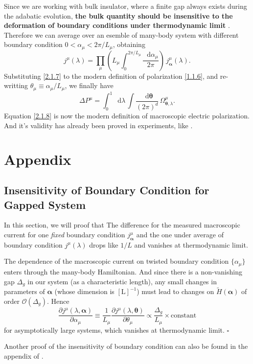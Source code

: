 \documentclass[10pt,nofootinbib]{revtex4}
\newcommand*\dd{\mathop{}\!\mathrm{d}}
\newcounter{Claim}[section]
\newenvironment{Claim}[1][]{{\par\normalfont\bfseries \underline{Claim~\stepcounter{Claim}\arabic{Claim}.}~#1~~}}{\par}
\newenvironment{Proof}{{\par~{\normalfont\bfseries $\vartriangleright$}~~}}{\hfill $\square$\par\hfill\par} %
\begin{document}
		\indent Since we are working with bulk insulator, where a finite gap always exists during the adabatic evolution, \textbf{the bulk quantity should be insensitive to the deformation of boundary conditions under thermodynamic limit} \cite{Niu1985quantized,Fradkin2013Field}. Therefore we can average over an esemble of many-body system with different boundary condition $0<\alpha_\mu<2\pi/L_\mu$, obtaining
		\begin{equation}\label{2.1.7}
			j^\mu(\lambda)=\prod_\mu\left(L_\mu\int_0^{2\pi/L_\mu}\dfrac{\dd \alpha_\mu}{2\pi}\right)\,j^\mu_{\bm{\alpha}}(\lambda).
		\end{equation}
		Substituting \eqref{2.1.7} to the modern definition of polarization \eqref{1.1.6}, and re-writting $\theta_\mu\equiv \alpha_\mu/L_\mu$, we finally have
		\begin{equation}\label{2.1.8}
			\Delta P^\mu=\int_0^1\dd\lambda\,\int\dfrac{\dd\bm{\theta}}{(2\pi)^d}\,\Omega_{\bm{\theta},\lambda}^\mu.
		\end{equation}
		Equation \eqref{2.1.8} is now the modern definition of macroscopic electric polarization. And it's validity has already been proved in experiments, like \cite{king1993theory}.
\section{Appendix}
	\subsection{Insensitivity of Boundary Condition for Gapped System}
		In this section, we will proof that
		\begin{Claim}
			The difference for the measured macroscopic current for one \emph{fixed} boundary condition $j^\mu_{\bm{\alpha}}$ and the one under average of boundary condition $j^\mu(\lambda)$ drops like $1/L$ and vanishes at thermodynamic limit.
		\end{Claim}
		\begin{Proof}
			The dependence of the macroscopic current on twisted boundary condition $\{\alpha_\mu\}$ enters through the many-body Hamiltonian. And since there is a non-vanishing gap $\Delta_g$ in our system (as a characteristic length), any small changes in parameters of $\bm{\alpha}$ (whose dimension is $[\mathrm{L}]^{-1}$) must lead to changes on $\widetilde{H}(\bm{\alpha})$ of order $\mathcal{O}(\Delta_g)$. Hence
			\begin{equation*}
				\dfrac{\partial j^\mu(\lambda,\bm{\alpha})}{\partial \alpha_\mu}\equiv\dfrac{1}{L_\mu}\dfrac{\partial j^\mu(\lambda,\bm{\theta})}{\partial \theta_\mu}\propto\dfrac{\Delta_g}{L_\mu}\times\text{constant}
			\end{equation*}
		for asymptotically large systems, which vanishes at thermodynamic limit. 
		\end{Proof}
		Another proof of the insensitivity of boundary condition can also be found in the appendix of \cite{Niu1985quantized}.


\end{document}
